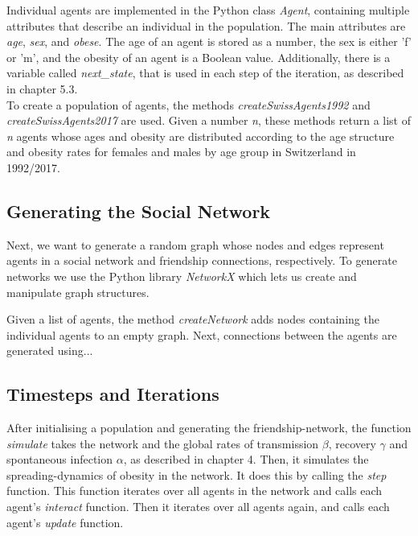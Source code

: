 \documentclass[11pt]{article}
\begin{document}
Individual agents are implemented in the Python class \textit{Agent}, containing multiple attributes that describe an individual in the population.
The main attributes are \textit{age}, \textit{sex}, and \textit{obese}. The age of an agent is stored as a number, the sex is either 'f' or 'm', and the obesity of an agent is a Boolean value. 
Additionally, there is a variable called \textit{next\_state}, that is used in each step of the iteration, as described in chapter 5.3. \\

To create a population of agents, the methods \textit{createSwissAgents1992} and \textit{createSwissAgents2017} are used. 
Given a number \textit{n}, these methods return a list of \textit{n} agents whose ages and obesity are distributed according to the age structure\cite{agestructure} and obesity rates\cite{bmistatistics} for females and males by age group in Switzerland in 1992/2017.

\subsection{Generating the Social Network}

Next, we want to generate a random graph whose nodes and edges represent agents in a social network and friendship connections, respectively. To generate networks we use the Python library \textit{NetworkX} which lets us create and manipulate graph structures.

Given a list of agents, the method \textit{createNetwork} adds nodes containing the individual agents to an empty graph. Next, connections between the agents are generated using...

\subsection{Timesteps and Iterations}

After initialising a population and generating the friendship-network, the function \textit{simulate} takes the network and the global rates of transmission \(\beta\), recovery \(\gamma\) and spontaneous infection \(\alpha\), as described in chapter 4. Then, it simulates the spreading-dynamics of obesity in the network.
It does this by calling the \textit{step} function. This function iterates over all agents in the network and calls each agent's \textit{interact} function. Then it iterates over all agents again, and calls each agent's \textit{update} function. \\
\end{document}
